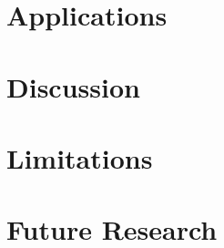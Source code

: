 \documentclass[annual]{acmsiggraph}
\begin{document}
\section{Applications}

\section{Discussion}

\section{Limitations}

\section{Future Research}



\end{document}
